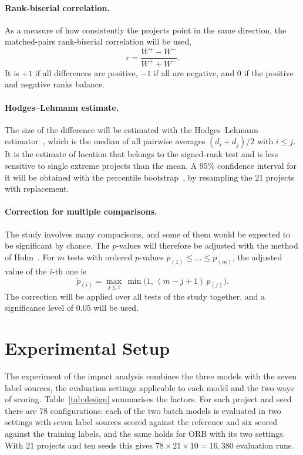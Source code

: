 \documentclass[12pt,a4paper,oneside]{report}
\begin{document}
\paragraph{Rank-biserial correlation.} As a measure of how consistently the
projects point in the same direction, the matched-pairs rank-biserial
correlation will be used,
\begin{equation}
r = \frac{W^{+} - W^{-}}{W^{+} + W^{-}}.
\end{equation}
It is $+1$ if all differences are positive, $-1$ if all are negative, and 0
if the positive and negative ranks balance.

\paragraph{Hodges--Lehmann estimate.} The size of the difference will be
estimated with the Hodges--Lehmann estimator~\cite{hodges1963}, which is the
median of all pairwise averages $(d_i + d_j)/2$ with $i \le j$. It is the
estimate of location that belongs to the signed-rank test and is less
sensitive to single extreme projects than the mean. A 95\% confidence
interval for it will be obtained with the percentile
bootstrap~\cite{efron1979bootstrap}, by resampling the 21 projects with
replacement.

\paragraph{Correction for multiple comparisons.} The study involves many
comparisons, and some of them would be expected to be significant by chance.
The $p$-values will therefore be adjusted with the method of
Holm~\cite{holm1979}. For $m$ tests with ordered $p$-values
$p_{(1)} \le \dots \le p_{(m)}$, the adjusted value of the $i$-th one is
\begin{equation}
\tilde{p}_{(i)} = \max_{j \le i}\,\min\bigl(1,\,(m-j+1)\,p_{(j)}\bigr).
\end{equation}
The correction will be applied over all tests of the study together, and a
significance level of 0.05 will be used.

\section{Experimental Setup}

The experiment of the impact analysis combines the three models with the
seven label sources, the evaluation settings applicable to each model and
the two ways of scoring. Table~\ref{tab:design} summarises the factors. For
each project and seed there are 78 configurations: each of the two batch
models is evaluated in two settings with seven label sources scored against
the reference and six scored against the training labels, and the same holds
for ORB with its two settings. With 21 projects and ten seeds this gives
$78 \times 21 \times 10 = 16{,}380$ evaluation runs.
\end{document}
